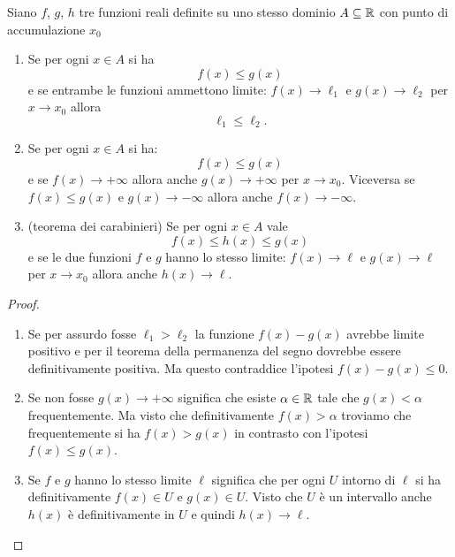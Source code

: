 \begin{theorem}
\label{th:confronto}%
%
%
%
%
\mymark{***}%
Siano 
$f$, $g$, $h$ tre funzioni reali%
definite su uno stesso dominio $A\subseteq {\mathbb R}$ 
con punto di accumulazione $x_0$
%
\begin{enumerate}
\item
Se per ogni $x\in A$ si ha
\[
f(x) \le g(x)
\]
e se entrambe le funzioni ammettono limite: $f(x) \to \ell_1$ 
e $g(x) \to \ell_2$ per $x\to x_0$
allora
\[
\ell_1 \le \ell_2.
\]

\item
Se per ogni $x\in A$ si ha:
\[
f(x) \le g(x)
\]
e se $f(x)\to +\infty$ allora anche $g(x) \to +\infty$ per $x\to x_0$.
Viceversa se $f(x) \le g(x)$ e $g(x) \to -\infty$ allora anche $f(x) \to -\infty$.

\item
(teorema dei carabinieri)
Se per ogni $x\in A$ vale
%
%
\[
f(x) \le h(x) \le g(x)
\]
 e se le due
funzioni $f$ e $g$ hanno lo stesso limite: $f(x) \to \ell$ e $g(x)\to \ell$
per $x\to x_0$
allora anche $h(x) \to \ell$.
\end{enumerate}
\end{theorem}
%
\begin{proof}
\mymark{**}
\begin{enumerate}
\item
Se per assurdo fosse $\ell_1 > \ell_2$
la funzione $f(x)-g(x)$ avrebbe limite positivo e per il teorema
della permanenza del segno dovrebbe essere definitivamente positiva. 
Ma questo contraddice l'ipotesi $f(x)-g(x)\le 0$. 

\item 
Se non fosse $g(x)\to +\infty$ significa che 
esiste $\alpha \in {\mathbb R}$ tale che $g(x)<\alpha$ frequentemente. 
Ma visto che definitivamente $f(x)>\alpha$ troviamo 
che frequentemente si ha $f(x)>g(x)$ in contrasto con l'ipotesi 
$f(x)\le g(x)$.

\item
Se $f$ e $g$ hanno lo stesso limite $\ell$ significa che per ogni
$U$ intorno di $\ell$ si ha definitivamente $f(x)\in U$ e $g(x)\in U$.
Visto che $U$ è un intervallo anche $h(x)$ è definitivamente in $U$ 
e quindi $h(x)\to \ell$.
\end{enumerate}
\end{proof}

